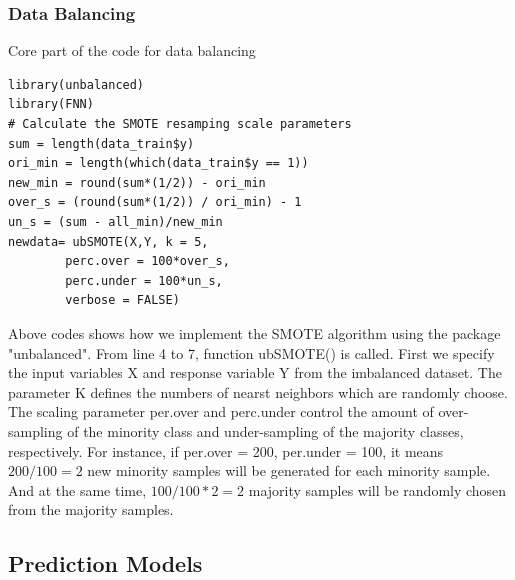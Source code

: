      \subsubsection{Data Balancing}
	 \noindent Core part of the code for data balancing
     \begin{lstlisting}
library(unbalanced)
library(FNN)
# Calculate the SMOTE resamping scale parameters
sum = length(data_train$y)
ori_min = length(which(data_train$y == 1))
new_min = round(sum*(1/2)) - ori_min
over_s = (round(sum*(1/2)) / ori_min) - 1 
un_s = (sum - all_min)/new_min 
newdata= ubSMOTE(X,Y, k = 5,
		perc.over = 100*over_s,
		perc.under = 100*un_s,
		verbose = FALSE)
     \end{lstlisting}
     Above codes shows how we implement the SMOTE algorithm using the package "unbalanced". From line 4 to 7, function ubSMOTE() is called. First we specify the input variables X and response variable Y from the imbalanced dataset. The parameter K defines the numbers of nearst neighbors which are randomly choose. The scaling parameter per.over and perc.under control the amount of over-sampling of the minority class and under-sampling of the majority classes, respectively. For instance, if per.over = 200, per.under = 100, it means $200/100 = 2$ new minority samples will be generated for each minority sample. And at the same time, $100/100 *2 = 2 $ majority samples will be randomly chosen from the majority samples. 
    \subsection{Prediction Models}
